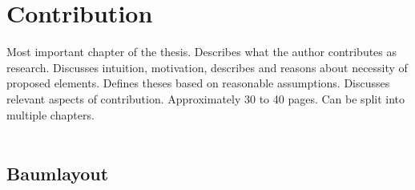 \chapter{Contribution}

Most important chapter of the thesis. Describes what the author contributes as research. Discusses intuition, motivation, describes and reasons about necessity of proposed elements. Defines theses based on reasonable assumptions. Discusses relevant aspects of contribution. Approximately 30 to 40 pages. Can be split into multiple chapters.
\\\\

\section{Baumlayout}

